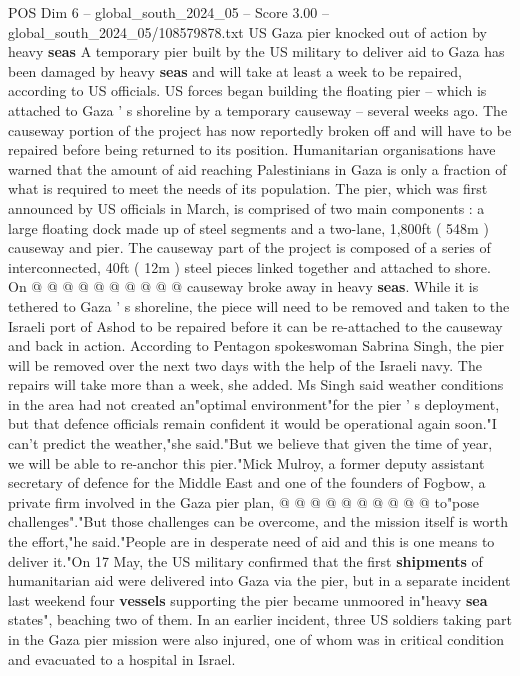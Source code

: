 \begin{textsample}{POS Dim 6 – global\_south\_2024\_05 – Score 3.00 – global\_south\_2024\_05/108579878.txt}  \label{ex:f6_pos_219}
US Gaza pier knocked out of action by heavy \textbf{seas} A temporary pier built by the US military to deliver aid to Gaza has been damaged by heavy \textbf{seas} and will take at least a week to be repaired, according to US officials.
US forces began building the floating pier -- which is attached to Gaza ' s shoreline by a temporary causeway -- several weeks ago.
The causeway portion of the project has now reportedly broken off and will have to be repaired before being returned to its position.
Humanitarian organisations have warned that the amount of aid reaching Palestinians in Gaza is only a fraction of what is required to meet the needs of its population.
The pier, which was first announced by US officials in March, is comprised of two main components : a large floating dock made up of steel segments and a two-lane, 1,800ft ( 548m ) causeway and pier.
The causeway part of the project is composed of a series of interconnected, 40ft ( 12m ) steel pieces linked together and attached to shore.
On @ @ @ @ @ @ @ @ @ @ causeway broke away in heavy \textbf{seas}.
While it is tethered to Gaza ' s shoreline, the piece will need to be removed and taken to the Israeli port of Ashod to be repaired before it can be re-attached to the causeway and back in action.
According to Pentagon spokeswoman Sabrina Singh, the pier will be removed over the next two days with the help of the Israeli navy.
The repairs will take more than a week, she added.
Ms Singh said weather conditions in the area had not created an"optimal environment"for the pier ' s deployment, but that defence officials remain confident it would be operational again soon."I can't predict the weather,"she said."But we believe that given the time of year, we will be able to re-anchor this pier."Mick Mulroy, a former deputy assistant secretary of defence for the Middle East and one of the founders of Fogbow, a private firm involved in the Gaza pier plan, @ @ @ @ @ @ @ @ @ @ to"pose challenges"."But those challenges can be overcome, and the mission itself is worth the effort,"he said."People are in desperate need of aid and this is one means to deliver it."On 17 May, the US military confirmed that the first \textbf{shipments} of humanitarian aid were delivered into Gaza via the pier, but in a separate incident last weekend four \textbf{vessels} supporting the pier became unmoored in"heavy \textbf{sea} states", beaching two of them.
In an earlier incident, three US soldiers taking part in the Gaza pier mission were also injured, one of whom was in critical condition and evacuated to a hospital in Israel.

\end{textsample}
